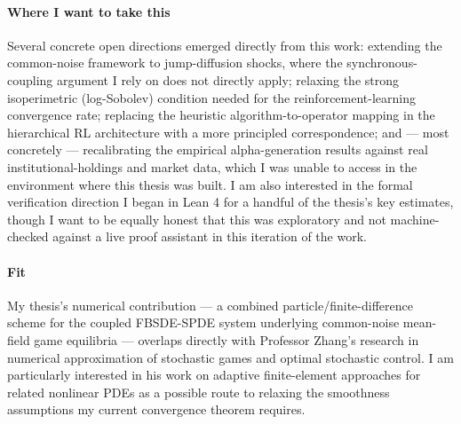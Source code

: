 \documentclass[11pt]{article}
\begin{document}
\paragraph{Where I want to take this} Several concrete open directions emerged directly from this
work: extending the common-noise framework to jump-diffusion shocks, where the
synchronous-coupling argument I rely on does not directly apply; relaxing the strong isoperimetric
(log-Sobolev) condition needed for the reinforcement-learning convergence rate; replacing the
heuristic algorithm-to-operator mapping in the hierarchical RL architecture with a more principled
correspondence; and --- most concretely --- recalibrating the empirical alpha-generation results
against real institutional-holdings and market data, which I was unable to access in the
environment where this thesis was built. I am also interested in the formal verification direction
I began in Lean 4 for a handful of the thesis's key estimates, though I want to be equally honest
that this was exploratory and not machine-checked against a live proof assistant in this iteration
of the work.

\paragraph{Fit} My thesis's numerical contribution --- a combined particle/finite-difference
scheme for the coupled FBSDE-SPDE system underlying common-noise mean-field game equilibria ---
overlaps directly with Professor Zhang's research in numerical approximation of stochastic games
and optimal stochastic control. I am particularly interested in his work on adaptive finite-element
approaches for related nonlinear PDEs as a possible route to relaxing the smoothness assumptions
my current convergence theorem requires.
\end{document}
